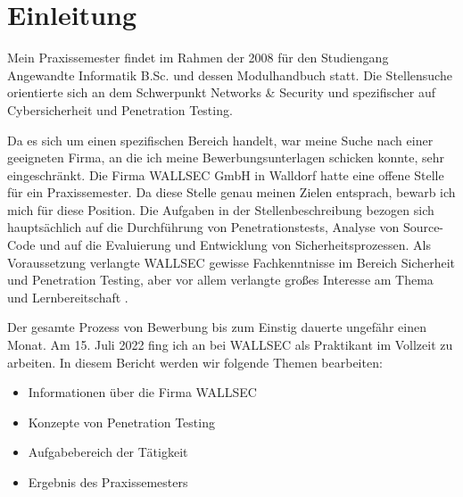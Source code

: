 \section{Einleitung}


Mein Praxissemester findet im Rahmen der  2008 für den Studiengang Angewandte Informatik B.Sc. und dessen Modulhandbuch \citep{Hochschule_Worms_FPO} statt. Die Stellensuche orientierte sich an dem Schwerpunkt Networks \& Security und spezifischer auf Cybersicherheit und Penetration Testing. 

Da es sich um einen spezifischen Bereich handelt, war meine Suche nach einer geeigneten Firma, an die ich meine Bewerbungsunterlagen schicken konnte, sehr eingeschränkt. Die Firma WALLSEC GmbH in Walldorf hatte eine offene Stelle für ein Praxissemester. Da diese Stelle genau meinen Zielen entsprach, bewarb ich mich für diese Position. Die Aufgaben in der Stellenbeschreibung bezogen sich hauptsächlich auf die Durchführung von Penetrationstests, Analyse von Source-Code und auf die Evaluierung und Entwicklung von Sicherheitsprozessen. Als Voraussetzung verlangte WALLSEC gewisse Fachkenntnisse im Bereich Sicherheit und Penetration Testing, aber vor allem verlangte großes Interesse am Thema und Lernbereitschaft \citep{Wallsec}.

Der gesamte Prozess von Bewerbung bis zum Einstig dauerte ungefähr einen Monat. Am 15. Juli 2022 fing ich an bei WALLSEC als Praktikant im Vollzeit zu arbeiten. In diesem Bericht werden wir folgende Themen bearbeiten:

\begin{itemize}
   \item Informationen über die Firma WALLSEC
   \item Konzepte von Penetration Testing
   \item Aufgabebereich der Tätigkeit
   \item Ergebnis des Praxissemesters
\end{itemize}

